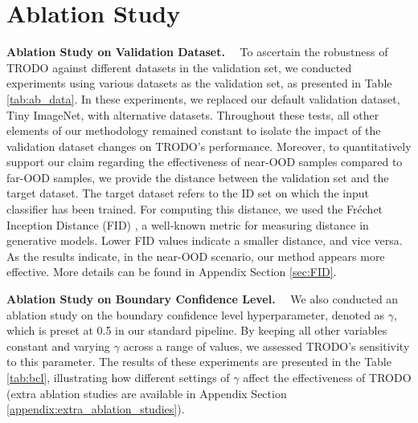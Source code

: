 \section{Ablation Study}


\textbf{Ablation Study on Validation Dataset.} \ \ To ascertain the robustness of TRODO against different datasets in the validation set, we conducted experiments using various datasets as the validation set, as presented in Table \ref{tab:ab_data}. In these experiments, we replaced our default validation dataset, Tiny ImageNet, with alternative datasets. Throughout these tests, all other elements of our methodology remained constant to isolate the impact of the validation dataset changes on TRODO's performance. Moreover, to quantitatively support our claim regarding the effectiveness of near-OOD samples compared to far-OOD samples, we provide the distance between the validation set and the target dataset. The target dataset refers to the ID set on which the input classifier has been trained. For computing this distance, we used the Fréchet Inception Distance (FID) \cite{DBLP:journals/corr/HeuselRUNKH17}, a well-known metric for measuring distance in generative models. Lower FID values indicate a smaller distance, and vice versa. As the results indicate, in the near-OOD scenario, our method appears more effective. More details can be found in Appendix Section \ref{sec:FID}. 
 

\textbf{Ablation Study on Boundary Confidence Level.} \ \ We also conducted an ablation study on the boundary confidence level hyperparameter, denoted as $\gamma$, which is preset at 0.5 in our standard pipeline. By keeping all other variables constant and varying $\gamma$ across a range of values, we assessed TRODO's sensitivity to this parameter. The results of these experiments are presented in the  Table \ref{tab:bcl}, illustrating how different settings of $\gamma$ affect the effectiveness of TRODO (extra ablation studies are available in Appendix Section \ref{appendix:extra_ablation_studies}).














